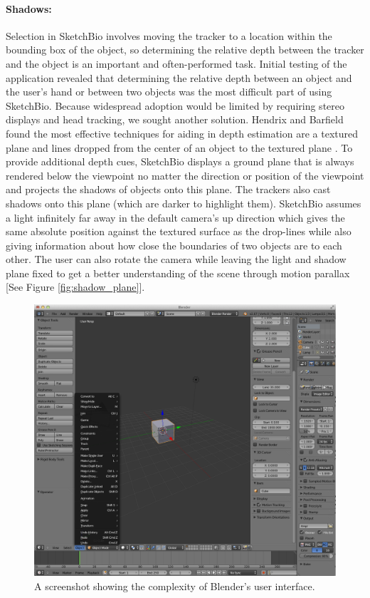 \documentclass[twocolumn]{bmcart}%
\begin{document}
\paragraph*{Shadows:}
Selection in SketchBio involves moving the tracker to a location within the bounding box of the object, so determining the relative depth between the tracker and the object is an important and often-performed task.  Initial testing of the application revealed that determining the relative depth between an object and the user's hand or between two objects was the most difficult part of using SketchBio.  Because widespread adoption would be limited by requiring stereo displays and head tracking, we sought another solution.   Hendrix and Barfield found the most effective techniques for aiding in depth estimation are a textured plane and lines dropped from the center of an object to the textured plane \cite{Hendrix1995103}.  To provide additional depth cues, SketchBio displays a ground plane that is always rendered below the viewpoint no matter the direction or position of the viewpoint and projects the shadows of objects onto this plane.  The trackers also cast shadows onto this plane (which are darker to highlight them).  SketchBio assumes a light infinitely far away in the default camera's up direction which gives the same absolute position against the textured surface as the drop-lines while also giving information about how close the boundaries of two objects are to each other.  The user can also rotate the camera while leaving the light and shadow plane fixed to get a better understanding of the scene through motion parallax [See Figure \ref{fig:shadow_plane}].

\begin{figure}[h]
\centering
\includegraphics[width=0.9\columnwidth]{blender_interface.png}
\caption{A screenshot showing the complexity of Blender's user interface.}
\label{fig:blender_interface}
\end{figure}
\end{document}
